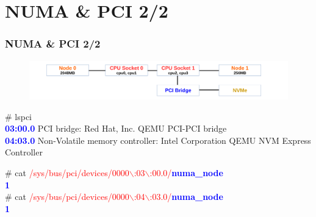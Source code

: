 \documentclass[aspectratio=169]{beamer}
\begin{document}
\section{NUMA \& PCI 2/2}
\begin{frame}
\frametitle{NUMA \& PCI 2/2}
\begin{figure}
\includegraphics[width=1.0\linewidth]{figures/numa-pci.pdf}
\end{figure}
\begin{block}{}
\# lspci \\
\textbf{\textcolor{blue}{03:00.0}} PCI bridge: Red Hat, Inc. QEMU PCI-PCI bridge \\
\textbf{\textcolor{blue}{04:03.0}} Non-Volatile memory controller: Intel Corporation QEMU NVM Express Controller \newline

\# cat \textcolor{red}{/sys/bus/pci/devices/0000$\backslash$:03$\backslash$:00.0/\textbf{\textcolor{blue}{numa\_node}}} \\
\textbf{\textcolor{blue}{1}} \\
\# cat \textcolor{red}{/sys/bus/pci/devices/0000$\backslash$:04$\backslash$:03.0/\textbf{\textcolor{blue}{numa\_node}}} \\
\textbf{\textcolor{blue}{1}}
\end{block}
\end{frame}

\end{document}

